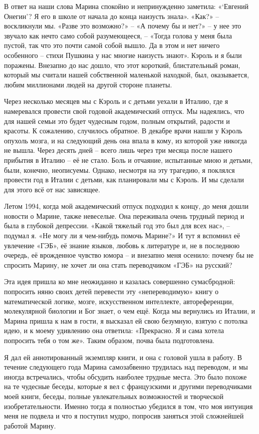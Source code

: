 \documentclass[../main.tex]{subfiles}
\begin{document}
В ответ на наши слова Марина спокойно и непринужденно заметила: «\enquote*{Евгений Онегин}? Я его в школе от начала до конца наизусть знала». «Как?» \--- воскликнули мы. «Разве это возможно?» \--- «А почему бы и нет?» \--- у нее это звучало как нечто само собой разумеющееся, \--- «Тогда голова у меня была пустой, так что это почти самой собой вышло. Да в этом и нет ничего особенного \--- стихи Пушкина у нас многие наизусть знают». Кэроль и я были поражены. Внезапно до нас дошло, что этот короткий, блистательный роман, который мы считали нашей собственной маленькой находкой, был, оказывается, любим миллионами людей на другой стороне планеты.

Через несколько месяцев мы с Кэроль и с детьми уехали в Италию, где я намеревался провести свой годовой академический отпуск. Мы надеялись, что для нашей семьи это будет чудесным годом, полным открытий, радости и красоты. К сожалению, случилось обратное. В декабре врачи нашли у Кэроль опухоль мозга, и на следующий день она впала в кому, из которой уже никогда не вышла. Через десять дней \--- всего лишь через три месяца после нашего прибытия в Италию \--- её не стало. Боль и отчаяние, испытанные миою и детьми, были, конечно, неописуемы. Однако, несмотря на эту трагедию, я поклялся провести год в Италии с детьми, как планировали мы с Кэроль. И мы сделали для этого всё от нас зависящее.

Летом 1994, когда мой академический отпуск подходил к концу, до меня дошли новости о Марине, также невеселые. Она переживала очень трудный период и была в глубокой депрессии. «Какой тяжелый год это был для всех нас», \--- подумал я. «Не могу ли я чем-нибудь помочь Марине?» И тут я вспомнил её увлечение «ГЭБ», её знание языков, любовь к литературе и, не в последнюю очередь, её врожденное чувство юмора \--- и внезапно меня осенило: почему бы не спросить Марину, не хочет ли она стать переводчиком «ГЭБ» на русский?

Эта идея пришла ко мне неожиданно и казалась совершенно сумасбродной: попросить няню своих детей перевести эту «непереводимую» книгу о математической логике, мозге, искусственном интеллекте, автореференции, молекулярной биологии и Бог знает, о чем ещё. Когда мы вернулись из Италии, и Марина пришла к нам в гости, я высказал ей свою безумную, взятую с потолка идею, и к моему удивлению она ответила: «Прекрасно. Я и сама хотела попросить тебя о том же». Таким образом, почва была подготовлена.

Я дал ей аннотированный экземпляр книги, и она с головой ушла в работу. В течение следующего года Марина самозабвенно трудилась над переводом, и мы иногда встречались, чтобы обсудить наиболее трудные места. Это было похоже на те чудесные беседы, которые я вел с французскими и другими переводчиками моей книги, беседы, полные увлекательных возможностей и творческой изобретательности. Именно тогда я полностью убедился в том, что моя интуиция меня не подвела и что я поступил мудро, попросив заняться этой сложнейшей работой Марину.
\end{document}
